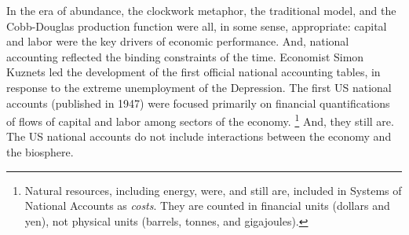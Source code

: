 In the era of abundance, 
the clockwork metaphor, 
the traditional model, 
and the Cobb-Douglas production function 
were all, in some sense, appropriate: 
capital and labor were the key drivers of economic performance.
And, national accounting reflected the binding constraints of the time. 
Economist Simon Kuznets led the development
of the first official national accounting tables,
in response to the extreme unemployment of the Depression. 
The first US national accounts (published in 1947) 
were focused primarily on financial quantifications 
of flows of capital and labor
among sectors of the economy.%
	\footnote{
	Natural resources, including energy, were, and still are, 
	included in Systems of National Accounts as \emph{costs}.
	They are counted in financial units
	(dollars and yen), 
	not physical units
	(barrels, tonnes, and gigajoules).
	}
And, they still are. 
The US national accounts do not include 
interactions between the economy and the biosphere.%
%	
%	
%	
%	
%	
%	
%	
%	
%	

